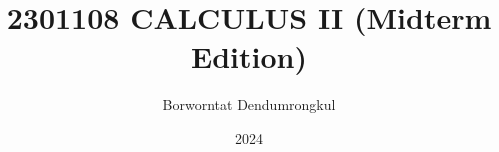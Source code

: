 \documentclass[11pt,titlepage=false]{scrreprt}
\begin{document}
\setlength{\textheight}{8.5in}
\setlength{\parskip}{2ex plus 0.5ex minus 0.2ex}
\setlength{\parindent}{0pt}


\title{2301108 CALCULUS II (Midterm Edition)}
\author{Borworntat Dendumrongkul}
\date{2024}
\maketitle

\tableofcontents

\setcounter{secnumdepth}{1}







% 
% 
\end{document}
